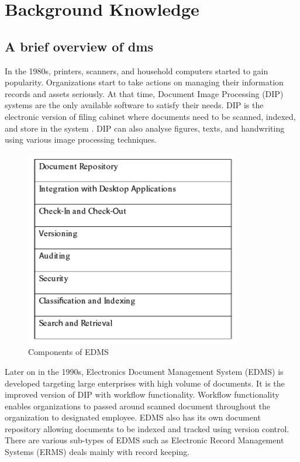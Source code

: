 \chapter{Background Knowledge}

\section{A brief overview of \gls{dms}}
In the 1980s, printers, scanners, and household computers started to gain popularity.
Organizations start to take actions on managing their information records and assets seriously.
At that time, Document Image Processing (DIP) systems are the only available software to satisfy their needs.
DIP is the electronic version of filing cabinet where documents need to be scanned, indexed, and store in the system \cite{1_adam_2008}.
DIP can also analyse figures, texts, and handwriting \cite{akram2010document} using various image processing techniques.
\begin{figure}
	\centering
	\includegraphics[scale=0.7]{res/bg-knowledge/edms-components.png}
	\caption{Components of EDMS }
	\label{fig:edms-components}
\end{figure}
Later on in the 1990s, Electronics Document Management System (EDMS) is developed targeting large enterprises with high volume of documents.
It is the improved version of DIP with workflow functionality.
Workflow functionality enables organizations to passed around scanned document throughout the organization to designated employee.
EDMS also has its own document repository allowing documents to be indexed and tracked using version control.
There are various sub-types of EDMS such as Electronic Record Management Systems (ERMS) deals mainly with record keeping.
